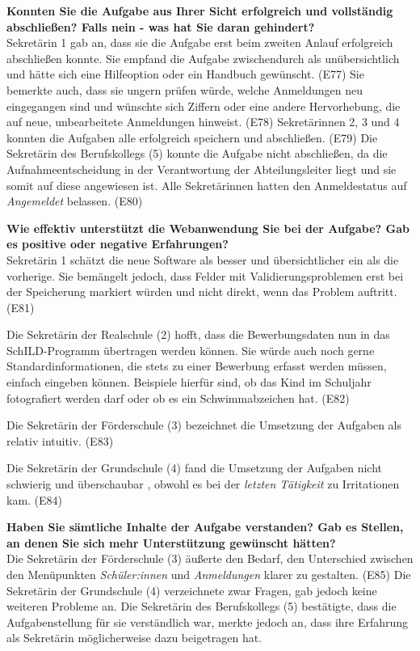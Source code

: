 \textbf{Konnten Sie die Aufgabe aus Ihrer Sicht erfolgreich und vollständig abschließen? Falls nein - was hat Sie daran gehindert?}\\
Sekretärin 1 gab an, dass sie die Aufgabe erst beim zweiten Anlauf erfolgreich abschließen konnte. Sie empfand die Aufgabe zwischendurch als unübersichtlich und hätte sich eine Hilfeoption oder ein Handbuch gewünscht. (E77) Sie bemerkte auch, dass sie ungern prüfen würde, welche Anmeldungen neu eingegangen sind und wünschte sich Ziffern oder eine andere Hervorhebung, die auf neue, unbearbeitete Anmeldungen hinweist. (E78)
Sekretärinnen 2, 3 und 4 konnten die Aufgaben alle erfolgreich speichern und abschließen.  (E79)
Die Sekretärin des Berufskollegs (5) konnte die Aufgabe nicht abschließen, da die Aufnahmeentscheidung in der Verantwortung der Abteilungsleiter liegt und sie somit auf diese angewiesen ist. Alle Sekretärinnen hatten den Anmeldestatus auf \textit{Angemeldet} belassen. (E80)

\textbf{Wie effektiv unterstützt die Webanwendung Sie bei der Aufgabe?  Gab es positive oder negative Erfahrungen?}\\
Sekretärin 1 schätzt die neue Software als besser und übersichtlicher ein als die vorherige. Sie bemängelt jedoch, dass Felder mit Validierungsproblemen erst bei der Speicherung markiert würden und nicht direkt, wenn das Problem auftritt. (E81)

Die Sekretärin der Realschule (2) hofft, dass die Bewerbungsdaten nun in das SchILD-Programm übertragen werden können. Sie würde auch noch gerne \glqq Standardinformationen\grqq{}, die stets zu einer Bewerbung erfasst werden müssen, einfach eingeben können. Beispiele hierfür sind, ob das Kind im Schuljahr fotografiert werden darf oder ob es ein Schwimmabzeichen hat. (E82) 

Die Sekretärin der Förderschule (3) bezeichnet die Umsetzung der Aufgaben als \glqq relativ intuitiv\grqq{}. (E83)

Die Sekretärin der Grundschule (4) fand die Umsetzung der Aufgaben \glqq nicht schwierig\grqq{}  und \glqq überschaubar\grqq{} , obwohl es bei der \textit{letzten Tätigkeit} zu Irritationen kam. (E84)

\textbf{Haben Sie sämtliche Inhalte der Aufgabe verstanden? Gab es Stellen, an denen Sie sich mehr Unterstützung gewünscht hätten?}\\
Die Sekretärin der Förderschule (3) äußerte den Bedarf, den Unterschied zwischen den Menüpunkten \textit{Schüler:innen} und \textit{Anmeldungen} klarer zu gestalten. (E85) Die Sekretärin der Grundschule (4) verzeichnete zwar Fragen, gab jedoch keine weiteren Probleme an. Die Sekretärin des Berufskollegs (5) bestätigte, dass die Aufgabenstellung für sie verständlich war, merkte jedoch an, dass ihre Erfahrung als Sekretärin möglicherweise dazu beigetragen hat.

